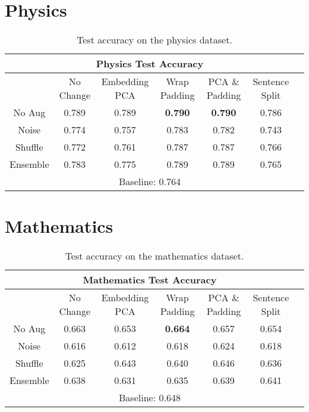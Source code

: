 \section{Physics}
  \begin{center}
    \begin{table}[H]
  \begin{tabular}{|c||c|c|c|c|c|c|}
   \hline
   \multicolumn{6}{|c|}{\textbf{Physics Test Accuracy}}\\ \hline
    & No Change & Embedding PCA & Wrap Padding & PCA \& Padding & Sentence Split\\  \hline
    No Aug & 0.789 & 0.789 & \textbf{0.790} & \textbf{0.790} & 0.786 \\ \hline
    Noise &  0.774 & 0.757 & 0.783 & 0.782 & 0.743  \\  \hline
    Shuffle & 0.772 & 0.761 & 0.787 & 0.787 & 0.766 \\      \hline
    Ensemble & 0.783 & 0.775 &  0.789 & 0.789 & 0.765 \\      \hline
    \multicolumn{6}{|c|}{Baseline: 0.764}\\ \hline
    \end{tabular}
    \caption{Test accuracy on the physics dataset.}
    \end{table}
    \end{center}

\section{Mathematics}
\begin{center}
\begin{table}[H]
 \begin{tabular}{|c||c|c|c|c|c|c|}
  \hline
  \multicolumn{6}{|c|}{\textbf{Mathematics Test Accuracy}}\\ \hline
   & No Change & Embedding PCA & Wrap Padding & PCA \& Padding & Sentence Split\\  \hline
   No Aug & 0.663 & 0.653 & \textbf{0.664} & 0.657 & 0.654\\      \hline
   Noise & 0.616 & 0.612 & 0.618 & 0.624 & 0.618  \\      \hline
   Shuffle & 0.625 & 0.643 & 0.640 & 0.646 & 0.636 \\      \hline
   Ensemble & 0.638 & 0.631 & 0.635 & 0.639 & 0.641 \\      \hline
   \multicolumn{6}{|c|}{Baseline: 0.648}\\ \hline
   \end{tabular}
   \caption{Test accuracy on the mathematics dataset.}
   \end{table}
  \end{center}

